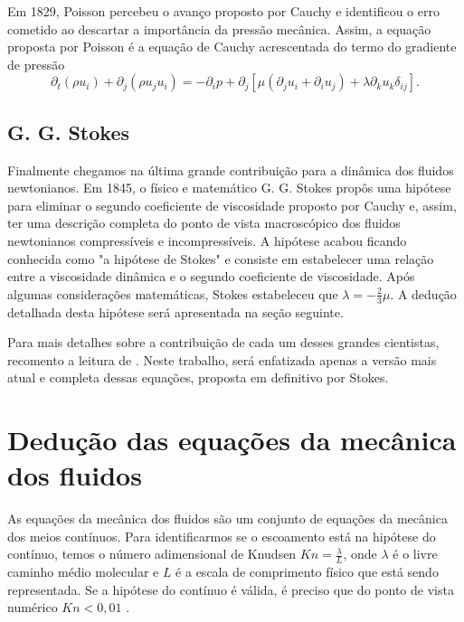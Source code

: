 Em 1829, Poisson percebeu o avanço proposto por Cauchy e identificou o erro cometido ao descartar a importância da pressão mecânica. Assim, a equação proposta por Poisson é a equação de Cauchy acrescentada do termo do gradiente de pressão
\begin{equation*}\label{Poisson}
\partial_{t}(\rho u_{i})+ \partial_{j} (\rho u_{j}u_{i})= -\partial_{i}p + \partial_{j}\left[\mu\left(\partial_{j}u_{i} + \partial_{i}u_{j}\right) +\lambda\partial_{k}u_{k}\delta_{ij}\right].
\end{equation*}

\subsection{G. G. Stokes}
Finalmente chegamos na última grande contribuição para a dinâmica dos fluidos newtonianos. Em 1845, o físico e matemático G. G. Stokes propôs \cite{stokes2007theories} uma hipótese para eliminar o segundo coeficiente de viscosidade proposto por Cauchy e, assim, ter uma descrição completa do ponto de vista macroscópico dos fluidos newtonianos compressíveis e incompressíveis. A hipótese acabou ficando conhecida como "a hipótese de Stokes" e consiste em estabelecer uma relação entre a viscosidade dinâmica e o segundo coeficiente de viscosidade. Após algumas considerações matemáticas, Stokes estabeleceu que $\lambda = - \frac{2}{3}\mu$. A dedução detalhada desta hipótese será apresentada na seção seguinte.

Para mais detalhes sobre a contribuição de cada um desses grandes cientistas, recomento a leitura de \cite{truesdell1953notes}. Neste trabalho, será enfatizada apenas a versão mais atual e completa dessas equações, proposta em definitivo por Stokes.

\section{Dedução das equações da mecânica dos fluidos} 
As equações da mecânica dos fluidos são um conjunto de equações da mecânica dos meios contínuos. Para identificarmos se o escoamento está na hipótese do contínuo, temos o número adimensional de  Knudsen $Kn = \frac{\lambda}{L}$, onde $\lambda$ é o livre caminho médio molecular e $L$ é a escala de comprimento físico que está sendo representada. Se a hipótese do contínuo é válida, é preciso que do ponto de vista numérico $Kn < 0,01$ \cite{karniadakis2006microflows}. 

